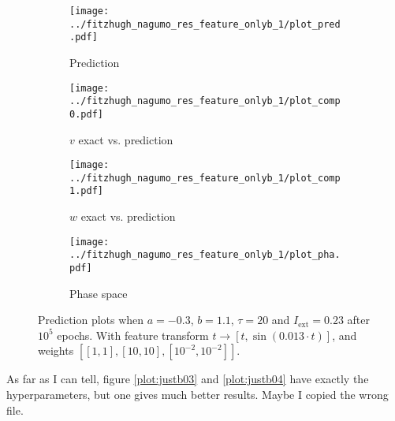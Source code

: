 \documentclass[a4paper]{article}
\begin{document}
\begin{figure}[H]
	\centering 
	\begin{subfigure}[b]{0.47\textwidth}
		\centering
		\texttt{[image: ../fitzhugh\_nagumo\_res\_feature\_onlyb\_1/plot\_pred.pdf]}
		\caption{Prediction}
		\label{fig:justb02a}
	\end{subfigure}
	\begin{subfigure}[b]{0.47\textwidth}
		\centering
		\texttt{[image: ../fitzhugh\_nagumo\_res\_feature\_onlyb\_1/plot\_comp0.pdf]}
		\caption{$v$ exact vs. prediction}
		\label{fig:justb02b}
	\end{subfigure}
	\begin{subfigure}[b]{0.47\textwidth}
		\centering
		\texttt{[image: ../fitzhugh\_nagumo\_res\_feature\_onlyb\_1/plot\_comp1.pdf]}
		\caption{$w$ exact vs. prediction}
		\label{fig:justb02c}
	\end{subfigure}
	\begin{subfigure}[b]{0.47\textwidth}
		\centering
		\texttt{[image: ../fitzhugh\_nagumo\_res\_feature\_onlyb\_1/plot\_pha.pdf]}
		\caption{Phase space}
		\label{fig:justb02d}
	\end{subfigure}
	\caption{Prediction plots when $a=-0.3$, $b=1.1$, $\tau=20$ and $ I_{\text{ext}}=0.23$ after $10^5$ epochs. With feature transform $t \rightarrow \left[ t, \sin(0.013\cdot t) \right] $, and weights $\left[ \left[ 1, 1\right], \left[ 10, 10\right], \left[ 10^{-2}, 10^{-2}\right]\right]$.}
	\label{plot:justb02}
\end{figure} 	


As far as I can tell, figure \ref{plot:justb03} and \ref{plot:justb04} have exactly the hyperparameters, but one gives much better results. Maybe I copied the wrong file.
\end{document}
